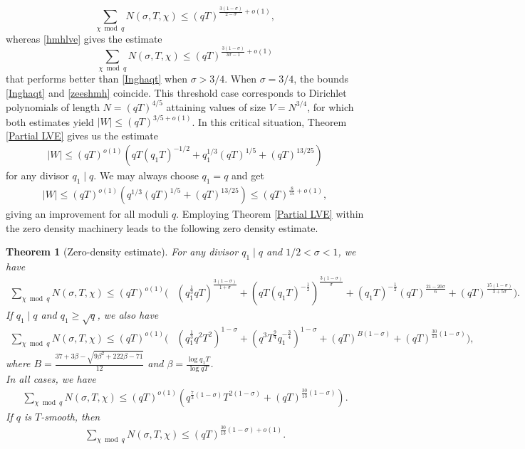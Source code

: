 \documentclass[12pt]{amsart}
\newtheorem{theorem}{Theorem}[section]
\theoremstyle{definition}
\theoremstyle{plain}
\theoremstyle{remark}
\numberwithin{equation}{section}
\numberwithin{theorem}{section}
\numberwithin{equation}{section}
\begin{document}
	\begin{equation}\label{Inghaqt}
		\sum_{\chi \bmod q}N(\sigma , T, \chi) \leq (qT)^{\frac{3(1-\sigma)}{2-\sigma}+o(1)},
	\end{equation}
	whereas \eqref{hmhlve} gives the estimate 
	\begin{equation}\label{zeeshmh}
		\sum_{\chi \bmod q}N(\sigma , T, \chi) \leq (qT)^{\frac{3(1-\sigma)}{3\sigma-1}+o(1)} 	
	\end{equation}
	that performs better than \eqref{Inghaqt} when $\sigma > 3/4$. When $\sigma=3/4$,  the bounds \eqref{Inghaqt} and \eqref{zeeshmh} coincide. This threshold case corresponds to Dirichlet polynomials of length $N=(qT)^{4/5}$ attaining values of size $V=N^{3/4}$, for which both estimates yield $|W| \leq (qT)^{3/5+o(1)}$. In this critical situation, Theorem \ref{Partial LVE} gives us the estimate
	\begin{align*}
		|W| \leq (qT)^{o(1)}(qT(q_1T)^{-1/2}+q_1^{1/3}(qT)^{1/5}+(qT)^{13/25})    
	\end{align*}
	for any divisor $q_1 \mid q$. We may always choose $q_1 = q$ and get
	\begin{align*}
		|W| \leq (qT)^{o(1)}(q^{1/3}(qT)^{1/5}+(qT)^{13/25}) \leq (qT)^{\frac{8}{15}+o(1)},
	\end{align*}
	giving an improvement for all moduli $q$. Employing Theorem \ref{Partial LVE} within the zero density machinery leads to the following zero density estimate.
	\begin{theorem}[Zero-density estimate]\label{zero density estimate}
		For any divisor $q_1 \mid q$ and $1/2<\sigma<1$, we have
		\begin{align*}
			\sum_{\chi \bmod q} N(\sigma,T,\chi)
			\leq (qT)^{o(1)}
			(&
			(q_1^{\frac{1}{3}}qT)^{\frac{3(1-\sigma)}{1+\sigma}}
			+
			(qT(q_1T)^{-\frac{1}{2}})^{\frac{3(1-\sigma)}{\sigma}}+
			(q_1T)^{-\frac{1}{2}}(qT)^{\frac{21-20\sigma}{6}}
			+
			(qT)^{\frac{15(1-\sigma)}{3+5\sigma}}
			).
		\end{align*}
		If $q_1 \mid q$ and $q_1 \geq \sqrt{q}$, we also have
		\begin{align*}
			\sum_{\chi \bmod{q}} N(\sigma,T,\chi)  \leq (qT)^{o(1)}(&(q_1^{\frac{1}{3}}q^2T^2)^{1-\sigma}+(q^3T^{\frac{9}{4}}q_1^{-\frac{3}{4}})^{1-\sigma}+ (qT)^{B(1-\sigma)} + (qT)^{\frac{30}{13}(1-\sigma)}),
		\end{align*}
		where $B=\frac{37+3\beta-\sqrt{9\beta^2+222\beta-71}}{12}$ and $\beta = \frac{\log{q_1T}}{\log{qT}}$.
		\\
		In all cases, we have 
		\begin{align*}
			\sum_{\chi \bmod q} N(\sigma,T, \chi) \leq (qT)^{o(1)}(q^{\frac{7}{3}(1-\sigma)}T^{2(1-\sigma)}+(qT)^{\frac{30}{13}(1-\sigma)}).
		\end{align*}
		If $q$ is $T$-smooth, then 
		\begin{align*}
			\sum_{\chi \bmod q} N(\sigma,T,\chi) \leq (qT)^{\frac{30}{13}(1-\sigma)+o(1)}.
		\end{align*}
	\end{theorem}
\end{document}
